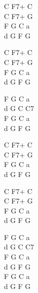 \begin{chord}
C F7+ C\\
C F7+ G\\
F G C a\\
d G F G

C F7+ C\\
C F7+ G\\
F G C a\\
d G F G

F G C a\\
d G C C7\\
F G C a\\
d G F G

C F7+ C\\
C F7+ G\\
F G C a\\
d G F G

C F7+ C\\
C F7+ G\\
F G C a\\
d G F G

F G C a\\
d G C C7\\
F G C a\\
d G F G\\
F G C a\\
d G F G
\end{chord}
